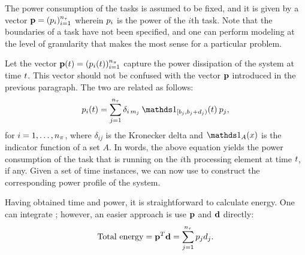 The power consumption of the tasks is assumed to be fixed, and it is given by a
vector $\mathbf{p} = (p_i)_{i = 1}^{{n_\tau}}$ wherein $p_i$ is the power of the $i$th
task. Note that the boundaries of a task have not been specified, and one can
perform modeling at the level of granularity that makes the most sense for a
particular problem.

Let the vector $\mathbf{p}(t) = (p_i(t))_{i = 1}^{{n_\pi}}$ capture the power
dissipation of the system at time $t$. This vector should not be confused with
the vector $\mathbf{p}$ introduced in the previous paragraph. The two are related as
follows:
\begin{equation} \elab{power}
  \p_i(\t) = \sum_{j = 1}^{\nt} \delta_{i\,m_j} \: \one_{[\b_j, \b_j +
    \d_j)}(\t) \: \p_j,
\end{equation}
for $i = 1, \dots, {n_\pi}$, where $\delta_{ij}$ is the Kronecker delta and
$\one_A(x)$ is the indicator function of a set $A$. In words, the above equation
yields the power consumption of the task that is running on the $i$th processing
element at time $t$, if any. Given a set of time instances, we can now use
 to construct the corresponding power profile of the system.

Having obtained time and power, it is straightforward to calculate energy. One
can integrate ; however, an easier approach is use $\mathbf{p}$ and $\mathbf{d}$
directly:
\[
  \text{Total energy} = \mathbf{p}^T \mathbf{d} = \sum_{j = 1}^{n_\tau} p_j d_j.
\]
